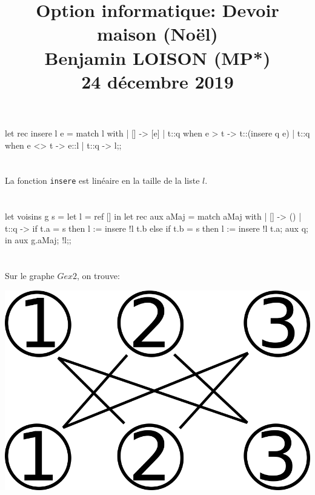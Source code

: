 \documentclass{article}
\newcommand{\code}[1]{\lstinline[style = mystyle]{#1}}
\begin{document}
	\obeylines

	\title{\vspace{-1.7cm}Option informatique: Devoir maison (Noël)\\
	\large Benjamin LOISON (MP*)
			\\24 décembre 2019}
	\date{}
	\maketitle

	\vspace{-2.3cm}\noindent\makebox[\linewidth]{\rule{\paperwidth}{0.4pt}}
	\vspace{4cm}\noindent\makebox[\linewidth]{\rule{\paperwidth}{0.4pt}}
		
		\section{}
			
			\begin{case}
let rec insere l e = match l with
| [] -> [e]
| t::q when e > t -> t::(insere q e)
| t::q when e <> t -> e::l
| t::q -> l;;
			\end{case}
			
		\section{}
		
			La fonction \code{insere} est linéaire en la taille de la liste $l$.
		
		\section{}
		
			\begin{case}
let voisins g s =
	let l = ref [] in
	let rec aux aMaj = match aMaj with
	| [] -> ()
	| t::q -> if t.a = s then l := insere !l t.b
			 else if t.b = s then l := insere !l t.a;
			 aux q;
	in aux g.aMaj;
	!l;;
			\end{case}
		
		\section{}
		
			Sur le graphe $Gex2$, on trouve:
		
			\includegraphics[scale=0.1]{IMG/PNG/4a.png}
\end{document}
